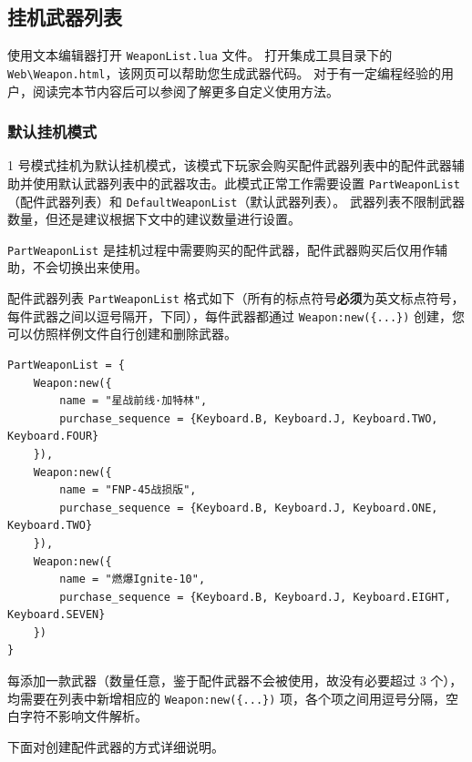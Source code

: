 \subsection{挂机武器列表}

使用文本编辑器打开 \lstinline{WeaponList.lua} 文件。
打开集成工具目录下的 \lstinline{Web\Weapon.html}，该网页可以帮助您生成武器代码。
对于有一定编程经验的用户，阅读完本节内容后可以参阅了解更多自定义使用方法。

\subsubsection{默认挂机模式}

1 号模式挂机为默认挂机模式，该模式下玩家会购买配件武器列表中的配件武器辅助并使用默认武器列表中的武器攻击。此模式正常工作需要设置 \lstinline{PartWeaponList}（配件武器列表）和 \lstinline{DefaultWeaponList}（默认武器列表）。
武器列表不限制武器数量，但还是建议根据下文中的建议数量进行设置。

\lstinline{PartWeaponList} 是挂机过程中需要购买的配件武器，配件武器购买后仅用作辅助，不会切换出来使用。

配件武器列表 \lstinline{PartWeaponList} 格式如下（所有的标点符号\textbf{\color{red}必须}为英文标点符号，每件武器之间以逗号隔开，下同），每件武器都通过 \lstinline|Weapon:new({...})| 创建，您可以仿照样例文件自行创建和删除武器。

\begin{verbatim}
PartWeaponList = {
    Weapon:new({
        name = "星战前线·加特林",
        purchase_sequence = {Keyboard.B, Keyboard.J, Keyboard.TWO, Keyboard.FOUR}
    }),
    Weapon:new({
        name = "FNP-45战损版",
        purchase_sequence = {Keyboard.B, Keyboard.J, Keyboard.ONE, Keyboard.TWO}
    }),
    Weapon:new({
        name = "燃爆Ignite-10",
        purchase_sequence = {Keyboard.B, Keyboard.J, Keyboard.EIGHT, Keyboard.SEVEN}
    })
}
\end{verbatim}

每添加一款武器（数量任意，鉴于配件武器不会被使用，故没有必要超过 3 个），均需要在列表中新增相应的 \lstinline|Weapon:new({...})| 项，各个项之间用逗号分隔，空白字符不影响文件解析。

下面对创建配件武器的方式详细说明。

